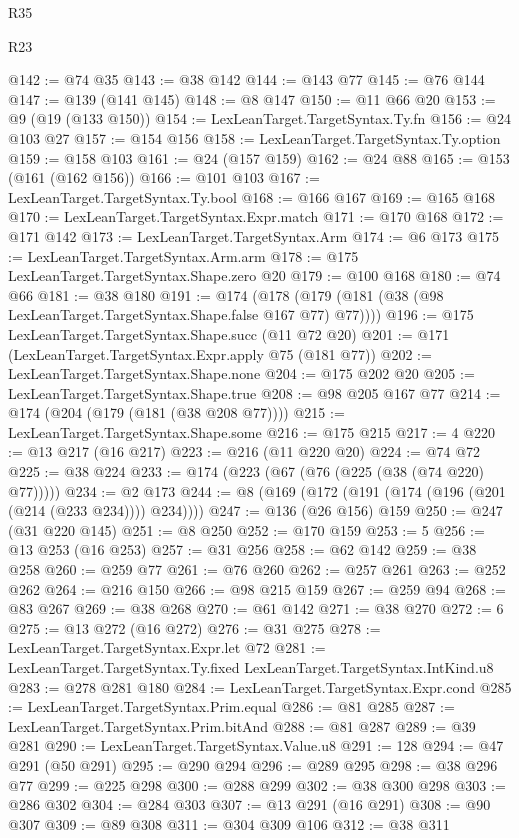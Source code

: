 \begin{lexlean}{R35}
\begin{lexlean}{R23}
\begin{coremodule}
{{{{{{{{{{{{{{{{{{{{{@142 := @74 @35
@143 := @38 @142
@144 := @143 @77
@145 := @76 @144
@147 := @139 (@141 @145)
@148 := @8 @147
@150 := @11 @66 @20
@153 := @9 (@19 (@133 @150))
@154 := LexLeanTarget.TargetSyntax.Ty.fn
@156 := @24 @103 @27
@157 := @154 @156
@158 := LexLeanTarget.TargetSyntax.Ty.option
@159 := @158 @103
@161 := @24 (@157 @159)
@162 := @24 @88
@165 := @153 (@161 (@162 @156))
@166 := @101 @103
@167 := LexLeanTarget.TargetSyntax.Ty.bool
@168 := @166 @167
@169 := @165 @168
@170 := LexLeanTarget.TargetSyntax.Expr.match
@171 := @170 @168
@172 := @171 @142
@173 := LexLeanTarget.TargetSyntax.Arm
@174 := @6 @173
@175 := LexLeanTarget.TargetSyntax.Arm.arm
@178 := @175 LexLeanTarget.TargetSyntax.Shape.zero @20
@179 := @100 @168
@180 := @74 @66
@181 := @38 @180
@191 := @174 (@178 (@179 (@181 (@38 (@98 LexLeanTarget.TargetSyntax.Shape.false @167 @77) @77))))
@196 := @175 LexLeanTarget.TargetSyntax.Shape.succ (@11 @72 @20)
@201 := @171 (LexLeanTarget.TargetSyntax.Expr.apply @75 (@181 @77))
@202 := LexLeanTarget.TargetSyntax.Shape.none
@204 := @175 @202 @20
@205 := LexLeanTarget.TargetSyntax.Shape.true
@208 := @98 @205 @167 @77
@214 := @174 (@204 (@179 (@181 (@38 @208 @77))))
@215 := LexLeanTarget.TargetSyntax.Shape.some
@216 := @175 @215
@217 := 4
@220 := @13 @217 (@16 @217)
@223 := @216 (@11 @220 @20)
@224 := @74 @72
@225 := @38 @224
@233 := @174 (@223 (@67 (@76 (@225 (@38 (@74 @220) @77)))))
@234 := @2 @173
@244 := @8 (@169 (@172 (@191 (@174 (@196 (@201 (@214 (@233 @234)))) @234))))
@247 := @136 (@26 @156) @159
@250 := @247 (@31 @220 @145)
@251 := @8 @250
@252 := @170 @159
@253 := 5
@256 := @13 @253 (@16 @253)
@257 := @31 @256
@258 := @62 @142
@259 := @38 @258
@260 := @259 @77
@261 := @76 @260
@262 := @257 @261
@263 := @252 @262
@264 := @216 @150
@266 := @98 @215 @159
@267 := @259 @94
@268 := @83 @267
@269 := @38 @268
@270 := @61 @142
@271 := @38 @270
@272 := 6
@275 := @13 @272 (@16 @272)
@276 := @31 @275
@278 := LexLeanTarget.TargetSyntax.Expr.let @72
@281 := LexLeanTarget.TargetSyntax.Ty.fixed LexLeanTarget.TargetSyntax.IntKind.u8
@283 := @278 @281 @180
@284 := LexLeanTarget.TargetSyntax.Expr.cond
@285 := LexLeanTarget.TargetSyntax.Prim.equal
@286 := @81 @285
@287 := LexLeanTarget.TargetSyntax.Prim.bitAnd
@288 := @81 @287
@289 := @39 @281
@290 := LexLeanTarget.TargetSyntax.Value.u8
@291 := 128
@294 := @47 @291 (@50 @291)
@295 := @290 @294
@296 := @289 @295
@298 := @38 @296 @77
@299 := @225 @298
@300 := @288 @299
@302 := @38 @300 @298
@303 := @286 @302
@304 := @284 @303
@307 := @13 @291 (@16 @291)
@308 := @90 @307
@309 := @89 @308
@311 := @304 @309 @106
@312 := @38 @311
}}}}}}}}}}}}}}}}}}}}}
\end{coremodule}
\end{lexlean}
\end{lexlean}
